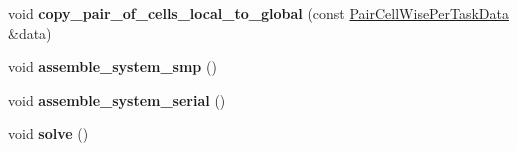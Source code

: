 \begin{DoxyCompactItemize}
\item 
\mbox{\label{classLaplaceBEM_1_1Erichsen1996Efficient_1_1Example2_a8844ffa9db41c840eb02dbb6eefed24d}} 
void {\bfseries copy\+\_\+pair\+\_\+of\+\_\+cells\+\_\+local\+\_\+to\+\_\+global} (const \hyperlink{structLaplaceBEM_1_1PairCellWisePerTaskData}{Pair\+Cell\+Wise\+Per\+Task\+Data} \&data)
\item 
\mbox{\label{classLaplaceBEM_1_1Erichsen1996Efficient_1_1Example2_a316947cbda2c520f03d8a703e909380f}} 
void {\bfseries assemble\+\_\+system\+\_\+smp} ()
\item 
\mbox{\label{classLaplaceBEM_1_1Erichsen1996Efficient_1_1Example2_a3e11e091f5fe741e19e72ad0cdc9c0c5}} 
void {\bfseries assemble\+\_\+system\+\_\+serial} ()
\item 
\mbox{\label{classLaplaceBEM_1_1Erichsen1996Efficient_1_1Example2_ae9e8baae33e3e331b84969b1315f0108}} 
void {\bfseries solve} ()
\end{DoxyCompactItemize}
